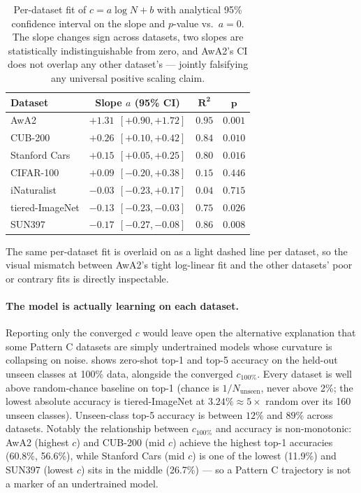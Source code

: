 \documentclass{article}
\begin{document}
\begin{table}[t]
\centering
\caption{Per-dataset fit of $c = a \log N + b$ with analytical 95\% confidence interval on the slope and $p$-value vs.\ $a = 0$. The slope changes sign across datasets, two slopes are statistically indistinguishable from zero, and AwA2's CI does not overlap any other dataset's --- jointly falsifying any universal positive scaling claim.}
\label{tab:logn_fits}
\begin{tabular}{lccc}
\toprule
\textbf{Dataset} & \textbf{Slope $a$ (95\% CI)} & $\boldsymbol{R^2}$ & $\boldsymbol{p}$ \\
\midrule
AwA2            & $+1.31\ \ [+0.90, +1.72]$ & $0.95$ & $0.001$ \\
CUB-200         & $+0.26\ \ [+0.10, +0.42]$ & $0.84$ & $0.010$ \\
Stanford Cars   & $+0.15\ \ [+0.05, +0.25]$ & $0.80$ & $0.016$ \\
CIFAR-100       & $+0.09\ \ [-0.20, +0.38]$ & $0.15$ & $0.446$ \\
iNaturalist     & $-0.03\ \ [-0.23, +0.17]$ & $0.04$ & $0.715$ \\
tiered-ImageNet & $-0.13\ \ [-0.23, -0.03]$ & $0.75$ & $0.026$ \\
SUN397          & $-0.17\ \ [-0.27, -0.08]$ & $0.86$ & $0.008$ \\
\bottomrule
\end{tabular}
\end{table}

The same per-dataset fit is overlaid on  as a light dashed line per dataset, so the visual mismatch between AwA2's tight log-linear fit and the other datasets' poor or contrary fits is directly inspectable.

\paragraph{The model is actually learning on each dataset.}
Reporting only the converged $c$ would leave open the alternative explanation that some Pattern C datasets are simply undertrained models whose curvature is collapsing on noise.
 shows zero-shot top-1 and top-5 accuracy on the held-out unseen classes at 100\% data, alongside the converged $c_{100\%}$.
Every dataset is well above random-chance baseline on top-1 (chance is $1/N_{\text{unseen}}$, never above 2\%; the lowest absolute accuracy is tiered-ImageNet at $3.24\% \approx 5\times$ random over its 160 unseen classes).
Unseen-class top-5 accuracy is between $12\%$ and $89\%$ across datasets.
Notably the relationship between $c_{100\%}$ and accuracy is non-monotonic: AwA2 (highest $c$) and CUB-200 (mid $c$) achieve the highest top-1 accuracies (60.8\%, 56.6\%), while Stanford Cars (mid $c$) is one of the lowest (11.9\%) and SUN397 (lowest $c$) sits in the middle (26.7\%) --- so a Pattern C trajectory is not a marker of an undertrained model.
\end{document}
